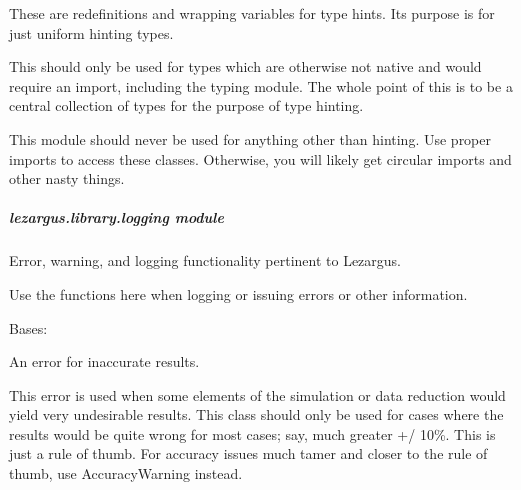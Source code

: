 \documentclass[letterpaper,11pt,english]{sphinxmanual}
\begin{document}
\sphinxAtStartPar
These are redefinitions and wrapping variables for type hints. Its purpose
is for just uniform hinting types.

\sphinxAtStartPar
This should only be used for types which are otherwise not native and would
require an import, including the typing module. The whole point of this is to
be a central collection of types for the purpose of type hinting.

\sphinxAtStartPar
This module should never be used for anything other than hinting. Use proper
imports to access these classes. Otherwise, you will likely get circular
imports and other nasty things.

\sphinxstepscope


\subparagraph{lezargus.library.logging module}
\label{\detokenize{code/lezargus.library.logging:module-lezargus.library.logging}}\label{\detokenize{code/lezargus.library.logging:lezargus-library-logging-module}}\label{\detokenize{code/lezargus.library.logging::doc}}
\sphinxAtStartPar
Error, warning, and logging functionality pertinent to Lezargus.

\sphinxAtStartPar
Use the functions here when logging or issuing errors or other information.

\begin{savenotes}\begin{fulllineitems}
\label{\detokenize{code/lezargus.library.logging:lezargus.library.logging.AccuracyError}}
\pysigstartsignatures
{}
\pysigstopsignatures
\sphinxAtStartPar
Bases: {\hyperref[\detokenize{code/lezargus.library.logging:lezargus.library.logging.LezargusError}]{}}

\sphinxAtStartPar
An error for inaccurate results.

\sphinxAtStartPar
This error is used when some elements of the simulation or data
reduction would yield very undesirable results. This class should only
be used for cases where the results would be quite wrong for most
cases; say, much greater +/\sphinxhyphen{} 10\%. This is just a rule of thumb. For
accuracy issues much tamer and closer to the rule of thumb, use
AccuracyWarning instead.

\end{fulllineitems}\end{savenotes}
\end{document}
